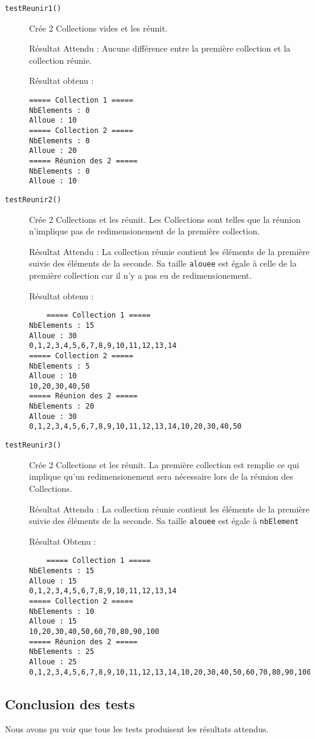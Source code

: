 \documentclass[10pt]{article}
\begin{document}
\begin{description}
	\item[\texttt{testReunir1()}] Crée 2 Collections vides et les réunit.
	
	Résultat Attendu : Aucune différence entre la première collection et la collection réunie.
	
	Résultat obtenu :
	\begin{verbatim}
===== Collection 1 =====
NbElements : 0
Alloue : 10
===== Collection 2 =====
NbElements : 0
Alloue : 20
===== Réunion des 2 =====
NbElements : 0
Alloue : 10
\end{verbatim}
	
	\item[\texttt{testReunir2()}] Crée 2 Collections et les réunit. Les Collections sont telles que la réunion n'implique pas de redimensionement de la première collection.
	
	Résultat Attendu : La collection réunie contient les éléments de la première suivie des éléments de la seconde. Sa taille \texttt{alouee} est égale à celle de la première collection car il n'y a pas eu de redimensionement.
	
	Résultat obtenu :
	\begin{verbatim}
	===== Collection 1 =====
NbElements : 15
Alloue : 30
0,1,2,3,4,5,6,7,8,9,10,11,12,13,14
===== Collection 2 =====
NbElements : 5
Alloue : 10
10,20,30,40,50
===== Réunion des 2 =====
NbElements : 20
Alloue : 30
0,1,2,3,4,5,6,7,8,9,10,11,12,13,14,10,20,30,40,50
\end{verbatim}
	
	\item[\texttt{testReunir3()}] Crée 2 Collections et les réunit. La première collection est remplie ce qui implique qu'un redimensionement sera nécessaire lors de la réunion des Collections.
	
	Résultat Attendu : La collection réunie contient les éléments de la première suivie des éléments de la seconde. Sa taille \texttt{alouee} est égale à \texttt{nbElement}
	
	Résultat Obtenu :
\begin{verbatim}
	===== Collection 1 =====
NbElements : 15
Alloue : 15
0,1,2,3,4,5,6,7,8,9,10,11,12,13,14
===== Collection 2 =====
NbElements : 10
Alloue : 15
10,20,30,40,50,60,70,80,90,100
===== Réunion des 2 =====
NbElements : 25
Alloue : 25
0,1,2,3,4,5,6,7,8,9,10,11,12,13,14,10,20,30,40,50,60,70,80,90,100
\end{verbatim} 
\end{description} 

\subsection{Conclusion des tests}
Nous avons pu voir que tous les tests produisent les résultats attendus. 
\end{document}
